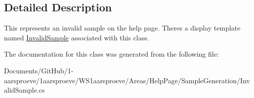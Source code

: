 \subsection{Detailed Description}
This represents an invalid sample on the help page. There\textquotesingle{}s a display template named \hyperlink{class_w_s1aarsproeve_1_1_areas_1_1_help_page_1_1_invalid_sample}{Invalid\+Sample} associated with this class. 



The documentation for this class was generated from the following file\+:\begin{DoxyCompactItemize}
\item 
Documents/\+Git\+Hub/1-\/aarsproeve/1aarsproeve/\+W\+S1aarsproeve/\+Areas/\+Help\+Page/\+Sample\+Generation/Invalid\+Sample.\+cs\end{DoxyCompactItemize}
